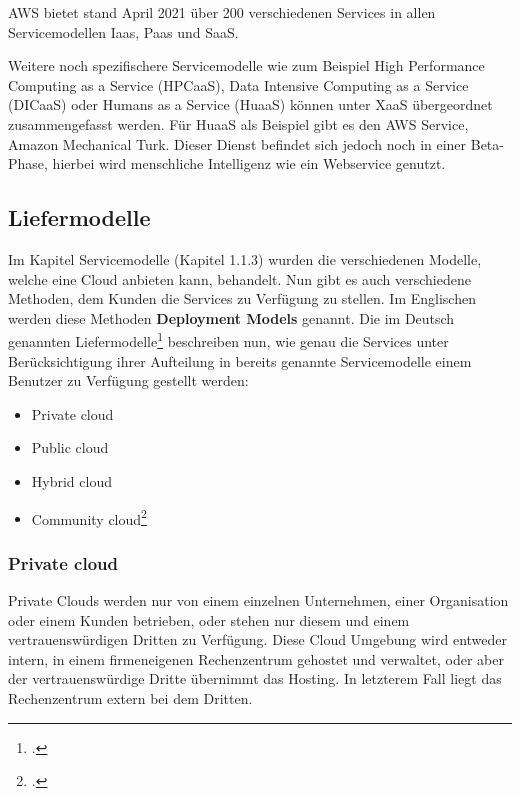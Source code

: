 AWS bietet stand April 2021 über 200 verschiedenen Services in allen Servicemodellen Iaas, Paas und SaaS.

Weitere noch spezifischere Servicemodelle wie zum Beispiel High Performance Computing as a Service (HPCaaS), Data Intensive Computing as a Service (DICaaS) oder Humans as a Service (HuaaS) können unter XaaS übergeordnet zusammengefasst werden.
Für HuaaS als Beispiel gibt es den AWS Service, Amazon Mechanical Turk.
Dieser Dienst befindet sich jedoch noch in einer Beta-Phase, hierbei wird menschliche Intelligenz wie ein Webservice genutzt.

\subsection{Liefermodelle}
Im Kapitel Servicemodelle (Kapitel 1.1.3) wurden die verschiedenen Modelle, welche eine Cloud anbieten kann, behandelt. Nun gibt es auch verschiedene Methoden, dem Kunden die Services zu Verfügung zu stellen.
Im Englischen werden diese Methoden \textbf{Deployment Models} genannt. Die im Deutsch genannten Liefermodelle\footcite{Lehrunterlagen-HTL-cloud} beschreiben nun, wie genau die Services unter Berücksichtigung ihrer Aufteilung in bereits genannte Servicemodelle einem Benutzer zu Verfügung gestellt werden:
\begin{itemize}
	\item Private cloud
	\item Public cloud
	\item Hybrid cloud
	\item Community cloud\footcite{cloud-types-pic}
\end{itemize}
\subsubsection{Private cloud}
Private Clouds werden nur von einem einzelnen Unternehmen, einer Organisation oder einem Kunden betrieben, oder stehen nur diesem und einem vertrauenswürdigen Dritten zu Verfügung.
Diese Cloud Umgebung wird entweder intern, in einem firmeneigenen Rechenzentrum gehostet und verwaltet, oder aber der vertrauenswürdige Dritte übernimmt das Hosting. In letzterem Fall liegt das Rechenzentrum extern bei dem Dritten.

